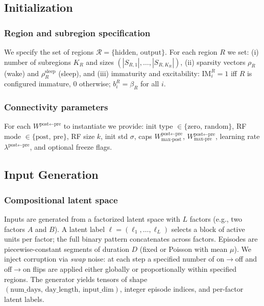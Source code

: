 \documentclass{article}
\begin{document}
\subsection*{Initialization}
\subsubsection*{Region and subregion specification}
We specify the set of regions $\mathcal{R}=\{\text{hidden},\,\text{output}\}$. For each region $R$ we set: (i) number of subregions $K_R$ and sizes $(|S_{R,1}|,\dots,|S_{R,K_R}|)$, (ii) sparsity vectors $\rho_R$ (wake) and $\rho_R^{\text{sleep}}$ (sleep), and (iii) immaturity and excitability: $\mathrm{IM}^R_i=1$ iff $R$ is configured immature, 0 otherwise; $b^R_i=\beta_R$ for all $i$.

\subsubsection*{Connectivity parameters}
For each $W^{\textrm{post}\leftarrow\textrm{pre}}$ to instantiate we provide: init type $\in\{\text{zero},\,\text{random}\}$, RF mode $\in\{\text{post},\,\text{pre}\}$, RF size $k$, init std $\sigma$, caps $W^{\textrm{post}\leftarrow\textrm{pre}}_{\text{max-post}}$, $W^{\textrm{post}\leftarrow\textrm{pre}}_{\text{max-pre}}$, learning rate $\lambda^{\textrm{post}\leftarrow\textrm{pre}}$, and optional freeze flags.

\subsection*{Input Generation}
\subsubsection*{Compositional latent space}
Inputs are generated from a factorized latent space with $L$ factors (e.g., two factors $A$ and $B$). A latent label $\ell=(\ell_1,\dots,\ell_L)$ selects a block of active units per factor; the full binary pattern concatenates across factors. Episodes are piecewise-constant segments of duration $D$ (fixed or Poisson with mean $\mu$). We inject corruption via \emph{swap} noise: at each step a specified number of on$\to$off and off$\to$on flips are applied either globally or proportionally within specified regions. The generator yields tensors of shape $(\text{num\_days},\,\text{day\_length},\,\text{input\_dim})$, integer episode indices, and per-factor latent labels.
\end{document}

